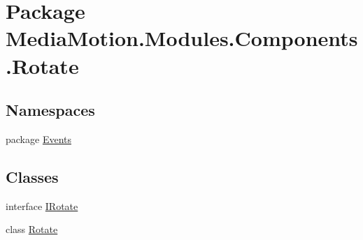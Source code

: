 \hypertarget{namespace_media_motion_1_1_modules_1_1_components_1_1_rotate}{\section{Package Media\+Motion.\+Modules.\+Components.\+Rotate}
\label{namespace_media_motion_1_1_modules_1_1_components_1_1_rotate}
}
\subsection*{Namespaces}
\begin{DoxyCompactItemize}
\item 
package \hyperlink{namespace_media_motion_1_1_modules_1_1_components_1_1_rotate_1_1_events}{Events}
\end{DoxyCompactItemize}
\subsection*{Classes}
\begin{DoxyCompactItemize}
\item 
interface \hyperlink{interface_media_motion_1_1_modules_1_1_components_1_1_rotate_1_1_i_rotate}{I\+Rotate}
\item 
class \hyperlink{class_media_motion_1_1_modules_1_1_components_1_1_rotate_1_1_rotate}{Rotate}
\end{DoxyCompactItemize}
